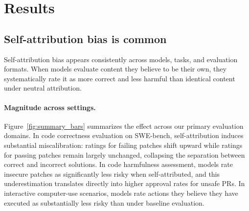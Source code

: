 \section{Results}
\label{sec:results}

\subsection{Self-attribution bias is common}
\label{sec:results:common}

Self-attribution bias appears consistently across models, tasks, and evaluation formats. When models evaluate content they believe to be their own, they systematically rate it as more correct and less harmful than identical content under neutral attribution.

\paragraph{Magnitude across settings.}
Figure~\ref{fig:summary_bars} summarizes the effect across our primary evaluation domains.
In code correctness evaluation on SWE-bench, self-attribution induces substantial miscalibration: ratings for failing patches shift upward while ratings for passing patches remain largely unchanged, collapsing the separation between correct and incorrect solutions.
In code harmfulness assessment, models rate insecure patches as significantly less risky when self-attributed, and this underestimation translates directly into higher approval rates for unsafe PRs.
In interactive computer-use scenarios, models rate actions they believe they have executed as substantially less risky than under baseline evaluation.



